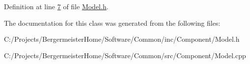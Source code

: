 Definition at line \mbox{\hyperlink{_model_8h_source_l00007}{7}} of file \mbox{\hyperlink{_model_8h_source}{Model.\+h}}.



The documentation for this class was generated from the following files\+:\begin{DoxyCompactItemize}
\item 
C\+:/\+Projects/\+Bergermeister\+Home/\+Software/\+Common/inc/\+Component/Model.\+h\item 
C\+:/\+Projects/\+Bergermeister\+Home/\+Software/\+Common/src/\+Component/Model.\+cpp\end{DoxyCompactItemize}

